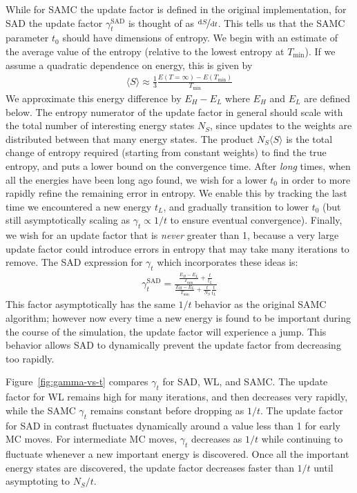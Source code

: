 \documentclass[letterpaper,twocolumn,amsmath,amssymb,pre,aps,10pt]{revtex4-1}
\begin{document}
While for SAMC the update factor is defined in the original
implementation, for SAD the update factor $\gamma_{t}^{\text{SAD}}$ is
thought of as $\nicefrac{\text{d}S}{\text{d}t}$. This tells us that
the SAMC parameter
$t_0$ should have dimensions of entropy.
We begin with an estimate of the average value of the entropy (relative
to the lowest entropy at $T_{\min}$).  If we assume a quadratic
dependence on energy, this is given by
\begin{align}
\langle S\rangle \approx \frac13 \frac{E({T=\infty}) - E(T_{\min})}{T_{\min}}
\end{align}
We approximate this energy difference by
$E_H -E_L$ where $E_H$ and $E_L$ are defined below.
The entropy numerator of the update factor
in general should scale with the total number of interesting
energy states $N_S$, since updates to the weights are distributed between
that many energy states.  The product $N_S\langle S\rangle$ is the
total change of entropy required (starting from constant weights) to find
the true entropy, and puts a lower bound on the convergence time.
After \emph{long} times, when
all the energies have been long ago found,
we wish for a lower $t_0$ in order to more rapidly refine the remaining
error in entropy.  We enable this
by tracking the last time we encountered a new energy $t_L$, and
gradually transition to lower $t_0$ (but still asymptotically scaling
as $\gamma_t \propto 1/t$ to ensure eventual convergence).  Finally,
we wish for an update factor that is \emph{never} greater than 1, because
a very large update factor could introduce errors in entropy that may take
many iterations to remove.  The SAD
expression for $\gamma_t$ which incorporates these ideas is:
\begin{align}
  \gamma_{t}^{\text{SAD}} =
     \frac{
       \frac{E_{H}-E_{L}}{T_{\text{min}}} + \frac{t}{t_L}
     }{
       \frac{E_{H}-E_{L}}{T_{\text{min}}} + \frac{t}{N_S}\frac{t}{t_L}
     }
\end{align}
This factor asymptotically has the same $1/t$ behavior as the original
SAMC algorithm;
however now every time a new energy is found to be important
during the course of
the simulation, the update factor will experience a jump. This behavior
allows SAD to dynamically prevent the update factor from decreasing too
rapidly.

Figure~\ref{fig:gamma-vs-t} compares $\gamma_t$ for SAD, WL,
and SAMC.  The update factor
for WL remains high for many iterations, and then decreases very rapidly,
while the SAMC $\gamma_t$ remains constant before dropping as $1/t$.
The update factor for SAD in contrast fluctuates
dynamically around a value less than 1 for early MC moves.
{\color{red} For intermediate MC moves, $\gamma_t$ decreases as
$1/t$ while continuing to fluctuate whenever a new important energy
is discovered.  Once all the important energy states are discovered, the
update factor decreases faster than $1/t$ until asymptoting to $N_S/t$.
}
\end{document}
